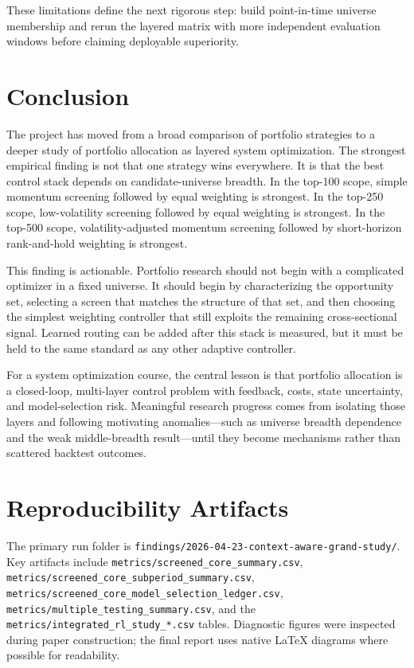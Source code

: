 \documentclass[11pt,a4paper]{article}
\begin{document}
These limitations define the next rigorous step: build point-in-time universe membership and rerun the layered matrix with more independent evaluation windows before claiming deployable superiority.

\section{Conclusion}
The project has moved from a broad comparison of portfolio strategies to a deeper study of portfolio allocation as layered system optimization. The strongest empirical finding is not that one strategy wins everywhere. It is that the best control stack depends on candidate-universe breadth. In the top-100 scope, simple momentum screening followed by equal weighting is strongest. In the top-250 scope, low-volatility screening followed by equal weighting is strongest. In the top-500 scope, volatility-adjusted momentum screening followed by short-horizon rank-and-hold weighting is strongest.

This finding is actionable. Portfolio research should not begin with a complicated optimizer in a fixed universe. It should begin by characterizing the opportunity set, selecting a screen that matches the structure of that set, and then choosing the simplest weighting controller that still exploits the remaining cross-sectional signal. Learned routing can be added after this stack is measured, but it must be held to the same standard as any other adaptive controller.

For a system optimization course, the central lesson is that portfolio allocation is a closed-loop, multi-layer control problem with feedback, costs, state uncertainty, and model-selection risk. Meaningful research progress comes from isolating those layers and following motivating anomalies---such as universe breadth dependence and the weak middle-breadth result---until they become mechanisms rather than scattered backtest outcomes.

\appendix
\section{Reproducibility Artifacts}
The primary run folder is \texttt{findings/2026-04-23-context-aware-grand-study/}. Key artifacts include \texttt{metrics/screened\_core\_summary.csv}, \texttt{metrics/screened\_core\_subperiod\_summary.csv}, \texttt{metrics/screened\_core\_model\_selection\_ledger.csv}, \texttt{metrics/multiple\_testing\_summary.csv}, and the \texttt{metrics/integrated\_rl\_study\_*.csv} tables. Diagnostic figures were inspected during paper construction; the final report uses native \LaTeX{} diagrams where possible for readability.
\end{document}
